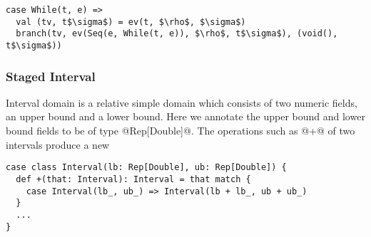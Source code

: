 \begin{lstlisting}
case While(t, e) =>
  val (tv, t$\sigma$) = ev(t, $\rho$, $\sigma$)
  branch(tv, ev(Seq(e, While(t, e)), $\rho$, t$\sigma$), (void(), t$\sigma$))
\end{lstlisting}

\subsubsection{Staged Interval}

Interval domain is a relative simple domain which consists of two numeric
fields, an upper bound and a lower bound. Here we annotate the upper bound and
lower bound fields to be of type @Rep[Double]@. The operations such as @+@ of
two intervals produce a new

\begin{lstlisting}
case class Interval(lb: Rep[Double], ub: Rep[Double]) {
  def +(that: Interval): Interval = that match {
    case Interval(lb_, ub_) => Interval(lb + lb_, ub + ub_)
  }
  ...
}
\end{lstlisting}

